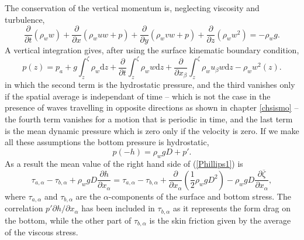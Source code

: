 The conservation of the vertical momentum is, neglecting viscosity and turbulence, 
\begin{equation}
 \frac{\partial }{\partial t} \left(\rho_w w\right)+ \frac{\partial }{\partial x} 
\left(\rho_w u w   + p  \right) + \frac{\partial }{\partial y} 
\left(\rho_w v w   + p  \right)+ \frac{\partial }{\partial z} \left(\rho_w w^2 \right)   = - \rho_w g.
\end{equation}
A vertical integration gives, after using the surface kinematic boundary condition, 
\begin{equation}
 p(z)=p_a + g\int_{z}^{\zeta} \rho_w \mathrm{d}z + \frac{\partial }{\partial t} \int_{z}^{\zeta} \rho_w w  \mathrm{d}z  
+ \frac{\partial }{\partial x_\beta} \int_{z}^{\zeta} \rho_w  u_\beta w  \mathrm{d}z
- \rho_w w^2(z).\label{p_z}
\end{equation}
in which the second term is the hydrostatic pressure, and the third
vanishes only if the spatial average is independant of time -- which is not the case in the presence of waves travelling in opposite directions as shown in chapter \ref{chsismo} --  
the fourth term vanishes for a motion that is periodic in time, and the 
last term is the mean dynamic pressure which is zero only if the velocity is zero.  If we make all these assumptions 
the bottom pressure is hydrostatic, 
\begin{equation}
 p(-h)=\rho_w g D + p'.
\end{equation}
As a result the mean value of the right hand side of (\ref{Phillips1}) is 
\begin{equation}
\tau_{a,\alpha} - \tau_{b,\alpha} + \rho_w g D \frac{\partial h}{\partial x_\alpha}= \tau_{a,\alpha} - \tau_{b,\alpha} + \frac{\partial }{\partial x_\alpha}\left(\frac{1}{2} \rho_w g D^2 \right)
-\rho_w g D \frac{\partial \overline{\zeta}}{\partial x_\alpha},
\end{equation}
where $\tau_{a,\alpha}$  and $\tau_{b,\alpha}$ are the $\alpha$-components of the surface and bottom stress. 
The correlation $p' \partial h/ \partial x_\alpha$ has been included in $\tau_{b,\alpha}$ as it represents the form drag 
on the bottom, while the other part of $\tau_{b,\alpha}$ is the skin friction given by the average of the viscous stress. 

